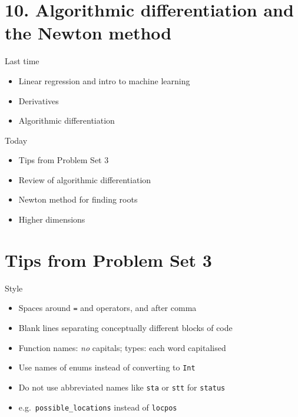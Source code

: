 \hypertarget{algorithmic-differentiation-and-the-newton-method}{%
\section{10. Algorithmic differentiation and the Newton
method}\label{algorithmic-differentiation-and-the-newton-method}}

\begin{frame}{Last time}
\protect\hypertarget{last-time}{}

\begin{itemize}
\item
  Linear regression and intro to machine learning
\item
  Derivatives
\item
  Algorithmic differentiation
\end{itemize}

\end{frame}

\begin{frame}{Today}
\protect\hypertarget{today}{}

\begin{itemize}
\item
  Tips from Problem Set 3
\item
  Review of algorithmic differentiation
\item
  Newton method for finding roots
\item
  Higher dimensions
\end{itemize}

\end{frame}

\hypertarget{tips-from-problem-set-3}{%
\section{Tips from Problem Set 3}\label{tips-from-problem-set-3}}

\begin{frame}[fragile]{Style}
\protect\hypertarget{style}{}

\begin{itemize}
\item
  Spaces around \texttt{=} and operators, and after comma
\item
  Blank lines separating conceptually different blocks of code
\item
  Function names: \emph{no} capitals; types: each word capitalised
\item
  Use names of enums instead of converting to \texttt{Int}
\item
  Do not use abbreviated names like \texttt{sta} or \texttt{stt} for
  \texttt{status}
\item
  e.g.~\texttt{possible\_locations} instead of \texttt{locpos}
\end{itemize}

\end{frame}


